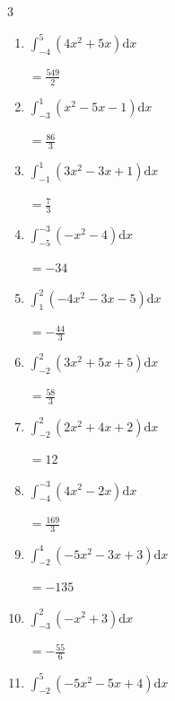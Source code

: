 \begin{multicols}{3}
\begin{enumerate}
  \item $\displaystyle \int_{-4}^{5}\left( 4x^{2}+5x \right) \mathrm{d}x$

        $\displaystyle =\frac{549}{2}$

  \item $\displaystyle \int_{-3}^{1}\left( x^{2}-5x-1 \right) \mathrm{d}x$

        $\displaystyle =\frac{86}{3}$

  \item $\displaystyle \int_{-1}^{1}\left( 3x^{2}-3x+1 \right) \mathrm{d}x$

        $\displaystyle =\frac{7}{3}$

  \item $\displaystyle \int_{-5}^{-3}\left( -x^{2}-4 \right) \mathrm{d}x$

        $\displaystyle =-34$

  \item $\displaystyle \int_{1}^{2}\left( -4x^{2}-3x-5 \right) \mathrm{d}x$

        $\displaystyle =-\frac{44}{3}$

\columnbreak %

  \item $\displaystyle \int_{-2}^{2}\left( 3x^{2}+5x+5 \right) \mathrm{d}x$

        $\displaystyle =\frac{58}{3}$

  \item $\displaystyle \int_{-2}^{2}\left( 2x^{2}+4x+2 \right) \mathrm{d}x$

        $\displaystyle =12$

  \item $\displaystyle \int_{-4}^{-3}\left( 4x^{2}-2x \right) \mathrm{d}x$

        $\displaystyle =\frac{169}{3}$

  \item $\displaystyle \int_{-2}^{4}\left( -5x^{2}-3x+3 \right) \mathrm{d}x$

        $\displaystyle =-135$

  \item $\displaystyle \int_{-3}^{2}\left( -x^{2}+3 \right) \mathrm{d}x$

        $\displaystyle =-\frac{55}{6}$

\columnbreak %

\resetques

  \item $\displaystyle \int_{-2}^{5}\left( -5x^{2}-5x+4 \right) \mathrm{d}x$


\end{enumerate}
\end{multicols}
